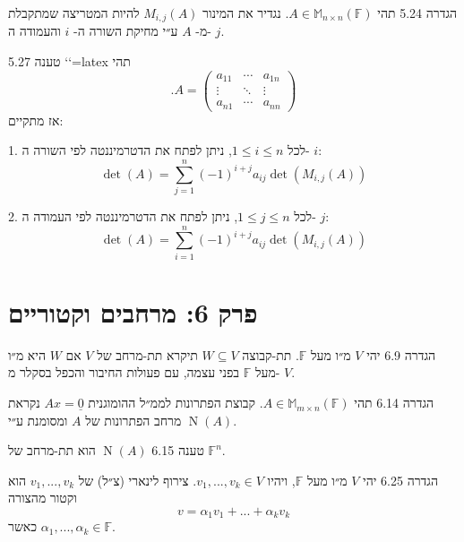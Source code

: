 \documentclass[a4paper, 11pt]{article}
\begin{document}
\begin{envbox}[defcolor]{הגדרה 5.24}
תהי $A\in\mathbb{M}_{n\times n}(\mathbb{F})$. נגדיר את המינור $M_{i,j}(A)$ להיות המטריצה שמתקבלת מ- $A$ ע״י מחיקת השורה ה- $i$ והעמודה ה- $j$.
\end{envbox}

\begin{envbox}[thmcolor]{טענה 5.27}
`\label{prop:laplace}`{=latex} תהי 
\[
.A=\begin{pmatrix}a_{11} & \cdots & a_{1n}\\
\vdots & \ddots & \vdots\\
a_{n1} & \cdots & a_{nn}
\end{pmatrix}
\]
 אז מתקיים:

1.  לכל $1\leq i \leq n$, ניתן לפתח את הדטרמיננטה לפי השורה ה- $i$: 
\[
\det(A)=\sum_{j=1}^n (-1)^{i+j}a_{ij}\det(M_{i,j}(A))
\]

2.  לכל $1\leq j \leq n$, ניתן לפתח את הדטרמיננטה לפי העמודה ה- $j$: 
\[
\det(A)=\sum_{i=1}^n (-1)^{i+j}a_{ij}\det(M_{i,j}(A))
\]
\end{envbox}

\newpage

\section{פרק 6: מרחבים וקטוריים}

\begin{envbox}[defcolor]{הגדרה 6.9}
יהי $V$ מ״ו מעל $\mathbb{F}$. תת-קבוצה $W\subseteq V$ תיקרא תת-מרחב של $V$ אם $W$ היא מ״ו מעל $\mathbb{F}$ בפני עצמה, עם פעולות החיבור והכפל בסקלר מ- $V$.
\end{envbox}

\begin{envbox}[defcolor]{הגדרה 6.14}
תהי $A\in\mathbb{M}_{m\times n}(\mathbb{F})$. קבוצת הפתרונות לממ״ל ההומוגנית $Ax=\underline{0}$ נקראת מרחב הפתרונות של $A$ ומסומנת ע״י $\mathop{\mathrm{N}}(A)$.
\end{envbox}

\begin{envbox}[thmcolor]{טענה 6.15}
$\mathop{\mathrm{N}}(A)$ הוא תת-מרחב של $\mathbb{F}^n$.
\end{envbox}

\begin{envbox}[defcolor]{הגדרה 6.25}
יהי $V$ מ״ו מעל $\mathbb{F}$, ויהיו $v_1,...,v_k\in V$. צירוף לינארי (צ״ל) של $v_1,...,v_k$ הוא וקטור מהצורה 
\[
v=\alpha_1v_1+...+\alpha_kv_k
\]
 כאשר $\alpha_1,...,\alpha_k\in\mathbb{F}$.
\end{envbox}
\end{document}
